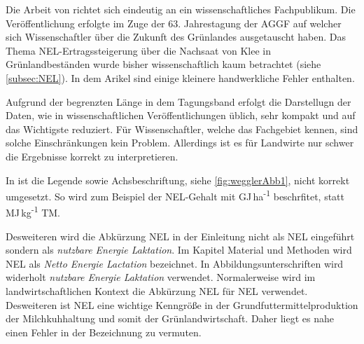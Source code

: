 Die Arbeit von \textcite{weggler2050leguminosen} richtet sich eindeutig an ein wissenschaftliches Fachpublikum.
Die Veröffentlichung erfolgte im Zuge der 63. Jahrestagung der \ac{AGGF} auf welcher sich Wissenschaftler über die Zukunft des Grünlandes ausgetauscht haben.
Das Thema \ac{NEL}-Ertragssteigerung über die Nachsaat von Klee in Grünlandbeständen wurde bisher wissenschaftlich kaum betrachtet (siehe \cref{subsec:NEL}).
In dem Arikel \parencite[33-36]{weggler2050leguminosen} sind einige kleinere handwerkliche Fehler enthalten.

Aufgrund der begrenzten Länge in dem Tagungsband erfolgt die Darstellugn der Daten, wie in wissenschaftlichen Veröffentlichungen üblich, sehr kompakt und auf das Wichtigste reduziert.
Für Wissenschaftler, welche das Fachgebiet kennen, sind solche Einschränkungen kein Problem.
Allerdings ist es für Landwirte nur schwer die Ergebnisse korrekt zu interpretieren.

In \textcite[35]{weggler2050leguminosen} ist die Legende sowie Achsbeschriftung, siehe \cref{fig:wegglerAbb1}, nicht korrekt umgesetzt.
So wird zum Beispiel der \ac{NEL}-Gehalt mit GJ\,ha\textsuperscript{-1} beschrfitet, statt MJ\,kg\textsuperscript{-1} \ac{TM}.

Desweiteren wird die Abkürzung \ac{NEL} in der Einleitung nicht als \acl{NEL} eingeführt sondern als \textit{nutzbare Energie Laktation}.
Im Kapitel Material und Methoden wird \ac{NEL} als \textit{Netto Energie Lactation} bezeichnet.
In Abbildungsunterschriften wird widerholt \textit{nutzbare Energie Laktation} verwendet.
Normalerweise wird im landwirtschaftlichen Kontext die Abkürzung \acs{NEL} für \acl{NEL} verwendet.
Desweiteren ist \ac{NEL} eine wichtige Kenngröße in der Grundfuttermittelproduktion der Milchkuhhaltung und somit der Grünlandwirtschaft.
Daher liegt es nahe einen Fehler in der Bezeichnung zu vermuten.






